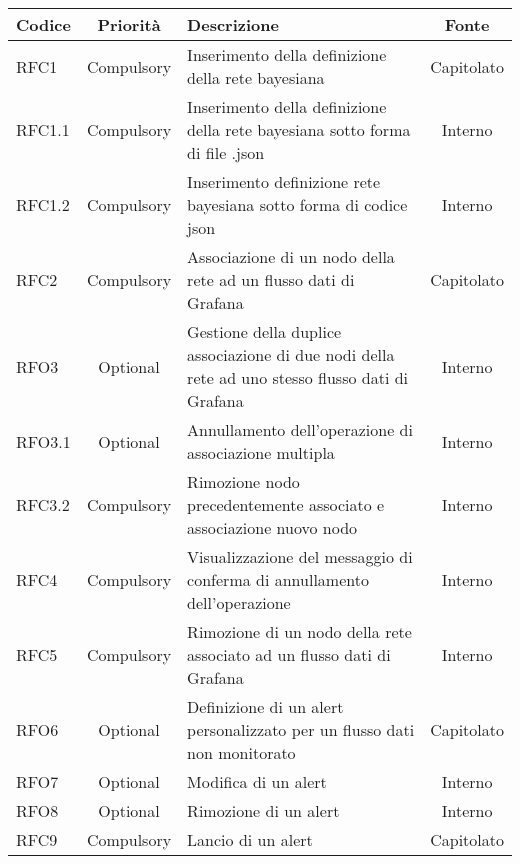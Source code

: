         \begin{table}[]
            \centering
            \renewcommand{\arraystretch}{1.5} %
            \begin{tabular}{|l|c|p{8cm}|c|}
                \rowcolor{orange!50}
        		\hline
        		\textbf{Codice} & \textbf{Priorità} & \textbf{Descrizione} & \textbf{Fonte}\\
                \hline
                RFC1 & Compulsory & Inserimento della definizione della rete bayesiana & Capitolato\\
                \hline
                RFC1.1 & Compulsory & Inserimento della definizione della rete bayesiana sotto forma di file .json & Interno\\
                \hline
                RFC1.2 & Compulsory & Inserimento definizione rete bayesiana sotto forma di codice json & Interno\\
                \hline
                RFC2 & Compulsory & Associazione di un nodo della rete ad un flusso dati di Grafana & Capitolato\\
                \hline
                RFO3 & Optional & Gestione della duplice associazione di due nodi della rete ad uno stesso flusso dati di Grafana & Interno\\
                \hline
                RFO3.1 & Optional & Annullamento dell'operazione di associazione multipla & Interno\\
                \hline
                RFC3.2 & Compulsory & Rimozione nodo precedentemente associato e associazione nuovo nodo & Interno\\
                \hline
                RFC4 & Compulsory & Visualizzazione del messaggio di conferma di annullamento dell'operazione & Interno\\
                \hline
                RFC5 & Compulsory & Rimozione di un nodo della rete associato ad un flusso dati di Grafana & Interno\\
                \hline
                RFO6 & Optional & Definizione di un alert personalizzato per un flusso dati non monitorato & Capitolato\\
                \hline
                RFO7 & Optional & Modifica di un alert & Interno\\
                \hline
                RFO8 & Optional & Rimozione di un alert & Interno\\
                \hline
                RFC9 & Compulsory & Lancio di un alert & Capitolato\\

\end{tabular}
\end{table}
